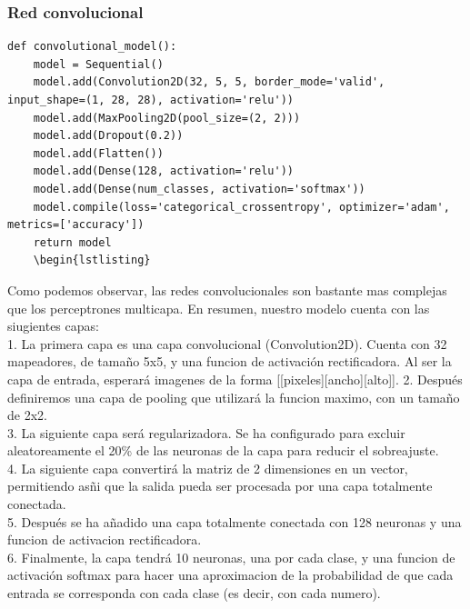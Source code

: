 \subsubsection{Red convolucional}
\begin{verbatim}
def convolutional_model():
	model = Sequential()
	model.add(Convolution2D(32, 5, 5, border_mode='valid', input_shape=(1, 28, 28), activation='relu'))
	model.add(MaxPooling2D(pool_size=(2, 2)))
	model.add(Dropout(0.2))
	model.add(Flatten())
	model.add(Dense(128, activation='relu'))
	model.add(Dense(num_classes, activation='softmax'))
	model.compile(loss='categorical_crossentropy', optimizer='adam', metrics=['accuracy'])
	return model
	\begin{lstlisting}
\end{verbatim}
Como podemos observar, las redes convolucionales son bastante mas complejas que los perceptrones multicapa. En resumen, nuestro modelo cuenta con las siugientes capas:\\
1. La primera capa es una capa convolucional (Convolution2D). Cuenta con 32 mapeadores, de tamaño 5x5, y una funcion de activación rectificadora. Al ser la capa de entrada, esperará imagenes de la forma [[pixeles][ancho][alto]].
2. Después definiremos una capa de pooling que utilizará la funcion maximo, con un tamaño de 2x2.\\
3. La siguiente capa será regularizadora. Se ha configurado para excluir aleatoreamente el 20\% de las neuronas de la capa para reducir el sobreajuste.\\
4. La siguiente capa convertirá la matriz de 2 dimensiones en un vector, permitiendo asñi que la salida pueda ser procesada por una capa totalmente conectada.\\
5. Después se ha añadido una capa totalmente conectada con 128 neuronas y una funcion de activacion rectificadora.\\
6. Finalmente, la capa tendrá 10 neuronas, una por cada clase, y una funcion de activación softmax para hacer una aproximacion de la probabilidad de que cada entrada se corresponda con cada clase (es decir, con cada numero).
